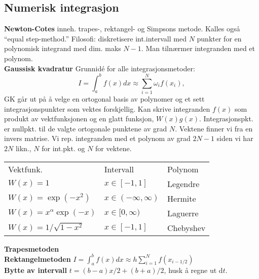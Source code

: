 \documentclass[12pt,a4paper,twocolumn]{article}
\begin{document}
\begin{flushleft}
\subsection{Numerisk integrasjon} %
\label{sub:numerisk_integrasjon}
\textbf{Newton-Cotes} inneh. trapes-, rektangel- og Simpsons metode. Kalles også ``equal step-method.'' Filosofi: diskretisere int.intervall med $N$ punkter for en polynomisk integrand med dim. maks $N-1$. Man tilnærmer integranden med et polynom.\\ 
\textbf{Gaussisk kvadratur} %
Grunnidé for alle integrasjonsmetoder:
\begin{equation*} 
   I=\int_a^bf(x)dx \approx \sum_{i=1}^N\omega_if(x_i),  
\end{equation*}
GK går ut på å velge en ortogonal basis av polynomer og et sett integrasjonspunkter som vektes forskjellig. Kan skrive integranden $f(x)$ som produkt av vektfunksjonen og en glatt funksjon, $W(x)g(x)$. Integrasjonspkt. er nullpkt. til de valgte ortogonale punktene av grad $N$. Vektene finner vi fra en invers matrise. Vi rep. integranden med et polynom av grad $2N-1$ siden vi har $2N$ likn., $N$ for int.pkt. og $N$ for vektene. 
\begin{table}[H]
  \centering
  \begin{tabular}{ l l l }
    Vektfunk. & Intervall & Polynom \\
    $W(x)=1$&$x\in[-1,1]$&Legendre\\
    $W(x)=\exp(-x^2)$&$x\in(-\infty,\infty)$&Hermite\\
    $W(x)=x^\alpha\exp(-x)$&$x\in[0,\infty)$&Laguerre\\
    $W(x)=1/\sqrt{1-x^2}$&$x\in[-1,1]$&Chebyshev\\
  \end{tabular}
\end{table}
\textbf{Trapesmetoden}\\
\textbf{Rektangelmetoden} $I=\int_a^bf(x) dx \approx  h\sum_{i=1}^N f(x_{i-1/2})$ \\
\textbf{Bytte av intervall} $t = (b-a)x/2 + (b+a)/2$, husk å regne ut d$t$.\\


\end{flushleft}
\end{document}
